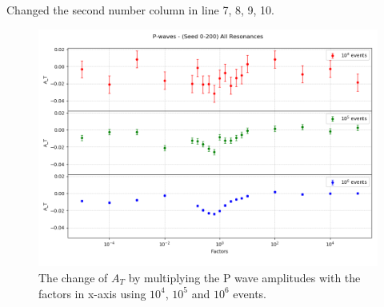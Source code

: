 Changed the second number column in line 7, 8, 9, 10.
\begin{figure}[h]
\center
\includegraphics*[width=0.76\linewidth]{p_wave/spd_waves_combined3_p}
\caption{The change of $A_T$ by multiplying the P wave amplitudes with the factors in x-axis using $10^4$, $10^5$ and $10^6$ events. }
\label{spd_waves_combined3_p}
\end{figure}

